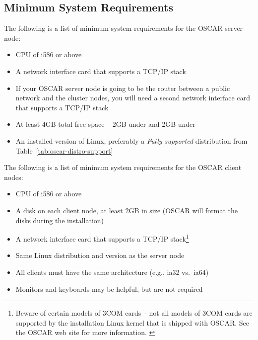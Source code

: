 


\subsection{Minimum System Requirements}
\label{sec:intro-min-sys}

\begchange

The following is a list of minimum system requirements for the OSCAR
server node:

\begin{itemize}
\item CPU of i586 or above
\item A network interface card that supports a TCP/IP stack
\item If your OSCAR server node is going to be the router between a
  public network and the cluster nodes, you will need a second
  network interface card that supports a TCP/IP stack
\item At least 4GB total free space -- 2GB under \file{/} and 2GB
  under 
\item An installed version of Linux, preferably a {\em Fully
    supported} distribution from Table~\ref{tab:oscar-distro-support}
\end{itemize}

\noindent The following is a list of minimum system requirements for
the OSCAR client nodes:

\begin{itemize}
\item CPU of i586 or above
\item A disk on each client node, at least 2GB in size (OSCAR will
  format the disks during the installation)
\item A network interface card that supports a TCP/IP
  stack\footnote{Beware of certain models of 3COM cards -- not all
    models of 3COM cards are supported by the installation Linux
    kernel that is shipped with OSCAR.  See the OSCAR web site for
    more information. \label{foot:3com-warning}}
\item Same Linux distribution and version as the server node
\item All clients must have the same architecture (e.g., ia32 vs.\ 
  ia64)
\item Monitors and keyboards may be helpful, but are not required
\end{itemize}

